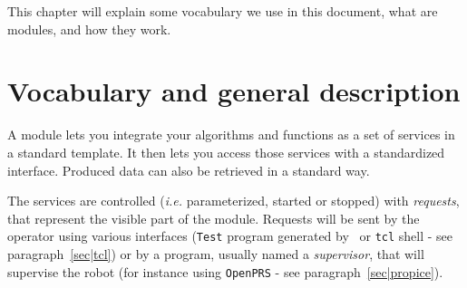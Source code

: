 %
%
%
%
%
%

This chapter will explain some vocabulary we use in this document, what
are modules, and how they work.


\section{Vocabulary and general description}
\label{sec|module|voc}

A module lets  you integrate your  algorithms and functions  as  a set of
services in a  standard template. It then lets  you access those services
with a standardized  interface. Produced data can  also be retrieved in a
standard way.

The services are controlled (\emph{i.e.} parameterized, started or stopped)
with  \emph{requests},  that  represent  the    visible  part   of   the
module. Requests  will be sent by the operator using various interfaces
(\texttt{Test} program  generated   by \GenoM\ or  \texttt{tcl}  shell  - see
paragraph~\vref{sec|tcl})    or  by a  program,    usually  named a  
\emph{supervisor},  that  will supervise  the  robot  (for  instance using
\texttt{OpenPRS} - see paragraph~\vref{sec|propice}).
 
